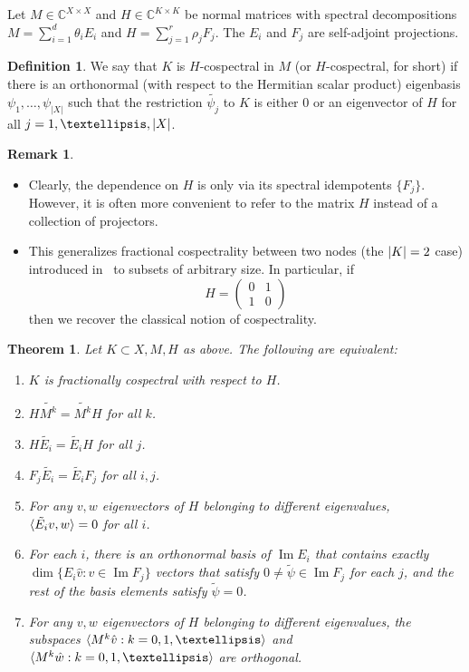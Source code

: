 \documentclass[11pt]{article}
\newtheorem{theorem}[theo]{Theorem}
\theoremstyle{definition}
\newtheorem{defi}[theo]{Definition}
\newtheorem{rema}[theo]{Remark}
\numberwithin{equation}{section}
\newcommand\+{\mkern2mu}
\newcommand{\C}{\mathbb{C}}
\newcommand{\1}{\mathbf 1}
\DeclareMathOperator{\im}{Im}
\DeclarePairedDelimiter{\abs}{\lvert}{\rvert}
\DeclarePairedDelimiter{\sprod}{\langle}{\rangle}
\begin{document}
Let $M \in \C^{X \times X}$ and $H \in \C^{K\times K}$ be normal matrices with spectral decompositions $M = \sum_{i=1}^d \theta_i E_i$ and $H = \sum_{j=1}^r \rho_j F_j$. The $E_i$ and $F_j$ are self-adjoint projections. 

\begin{defi}\label{def:cospectral}
We say that $K$ is $H$-cospectral in $M$ (or $H$-cospectral, for short) if there is an orthonormal (with respect to the Hermitian scalar product) eigenbasis $\psi_1, \dots, \psi_{|X|}$ such that the restriction $\tilde{\psi_j}$ to $K$ is either 0 or an eigenvector of $H$ for all $j = 1, \dots, \abs{X}$.\end{defi}

\begin{rema}~
\begin{itemize}
\item Clearly, the dependence on $H$ is only via its spectral idempotents $\{F_j\}$. However, it is often more convenient to refer to the matrix $H$ instead of a collection of projectors.
\item This generalizes fractional cospectrality between two nodes (the $\abs{K} =2$ case) introduced in~\cite{chan2020fundamentals} to subsets of arbitrary size. In particular, if \begin{equation}\label{eq:0110} H = \left( \begin{array}{cc} 0 & 1\\ 1 & 0 \end{array} \right)\end{equation} then we recover the classical notion of cospectrality.
\end{itemize}
\end{rema}

\begin{theorem}\label{thm:frac_cosp}
Let $K \subset X, M, H$ as above. The following are equivalent:
\begin{enumerate}
\item\label{it:frco} $K$ is fractionally cospectral with respect to $H$.
\item\label{it:HMk} $H \widetilde{M^k} = \widetilde{M^k} H$ for all $k$.
\item\label{it:HEi} $H \tilde{E_i} = \tilde{E_i} H$ for all $j$.
\item\label{it:FjEi} $F_j \tilde{E_i} = \tilde{E_i}F_j$ for all $i,j$.
\item\label{it:Eivw} For any $v,w$ eigenvectors of $H$ belonging to different eigenvalues, $\sprod{\tilde{E_i} v, w} = 0$ for all $i$.
\item\label{it:basisrk} For each $i$, there is an orthonormal basis of $\im E_i$ that contains exactly $\dim \{ E_i \hat{v} : v \in
\im F_j \}$ vectors that satisfy $0\neq \tilde{\psi} \in \im F_j $ for each $j$, and the rest of the basis elements satisfy $\tilde{\psi} = 0$.
\item\label{it:Mkw} For any $v,w$ eigenvectors of $H$ belonging to different eigenvalues, the subspaces $\sprod{M^k \hat{v} : k=0,1,\dots}$ and $\sprod{M^k \hat{w} : k=0,1,\dots}$ are orthogonal.
\end{enumerate}
\end{theorem}
\end{document}
